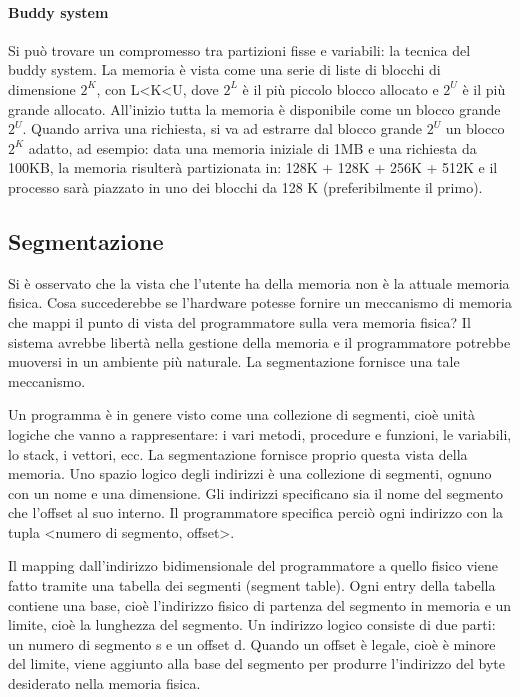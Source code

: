 \documentclass[a4paper]{article}
\begin{document}
\paragraph{Buddy system}
Si può trovare un compromesso tra partizioni fisse e variabili: la tecnica del buddy system. La memoria è vista come una serie di liste di blocchi di dimensione $2^K$, con L<K<U, dove $2^L$ è il più piccolo blocco allocato e $2^U$ è il più grande allocato. All'inizio tutta la memoria è disponibile come un blocco grande $2^U$. Quando arriva una richiesta, si va ad estrarre dal blocco grande $2^U$ un blocco $2^K$ adatto, ad esempio: data una memoria iniziale di 1MB e una richiesta da 100KB, la memoria risulterà partizionata in: 128K + 128K + 256K + 512K e il processo sarà piazzato in uno dei blocchi da 128 K (preferibilmente il primo).

\subsection{Segmentazione}
Si è osservato che la vista che l'utente ha della memoria non è la attuale memoria fisica. Cosa succederebbe se l'hardware potesse fornire un meccanismo di memoria che mappi il punto di vista del programmatore sulla vera memoria fisica? Il sistema avrebbe libertà nella gestione della memoria e il programmatore potrebbe muoversi in un ambiente più naturale. La segmentazione fornisce una tale meccanismo.

Un programma è in genere visto come una collezione di segmenti, cioè unità logiche che vanno a rappresentare: i vari metodi, procedure e funzioni, le variabili, lo stack, i vettori, ecc. La segmentazione fornisce proprio questa vista della memoria. Uno spazio logico degli indirizzi è una collezione di segmenti, ognuno con un nome e una dimensione. Gli indirizzi specificano sia il nome del segmento che l'offset al suo interno. Il programmatore specifica perciò ogni indirizzo con la tupla <numero di segmento, offset>.

Il mapping dall'indirizzo bidimensionale del programmatore a quello fisico viene fatto tramite una tabella dei segmenti (segment table). Ogni entry della tabella contiene una base, cioè l'indirizzo fisico di partenza del segmento in memoria e un limite, cioè la lunghezza del segmento. Un indirizzo logico consiste di due parti: un numero di segmento s e un offset d. Quando un offset è legale, cioè è minore del limite, viene aggiunto alla base del segmento per produrre l'indirizzo del byte desiderato nella memoria fisica.
\end{document}
